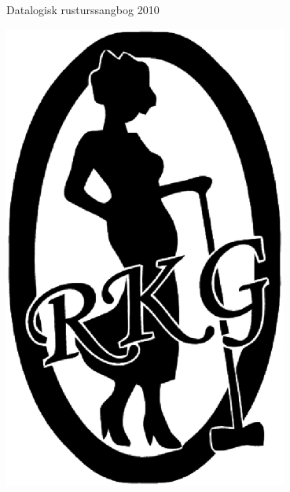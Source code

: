 
\begin{center}
{\LARGE Datalogisk rusturssangbog 2010}\\


\begin{center}
\includegraphics[width=0.7\textwidth]{logo.eps}
\end{center}


\end{center}


\newpage
